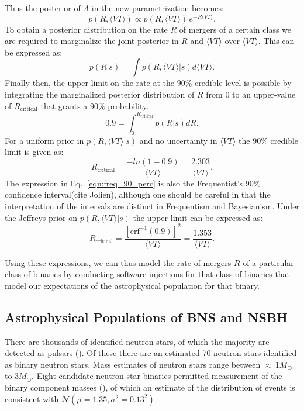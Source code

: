 Thus the posterior of $\Lambda$ in the new parametrization becomes:
\begin{equation}\label{eqn:posterior_lambda}
    p \left(R, \langle VT \rangle \right) \propto p\left(R, \langle VT \rangle \right) \, e^{-R \langle VT \rangle}.
\end{equation}
To obtain a posterior distribution on the rate $R$ of mergers of a certain class we are required to marginalize the joint-posterior in $R$ and $\langle VT \rangle$ over $\langle VT \rangle$. This can be expressed as:
\begin{equation}\label{eqn:posterior_rate}
    p\left(R | s\right) = \int p \left(R, \langle VT \rangle | s \right) d\langle VT \rangle.
\end{equation}
Finally then, the upper limit on the rate at the $90 \%$ credible level is possible by integrating the marginalized posterior distribution of $R$ from $0$ to an upper-value of $R_\mathrm{critical}$ that grants a $90 \%$ probability.
\begin{equation}\label{eqn:90perc_conf_int}
    0.9 = \int_0^{R_{\mathrm{critical}}} p\left(R | s\right) dR.
\end{equation}
For a uniform prior in $p \left(R, \langle VT \rangle | s \right)$ and no uncertainty in $\langle VT \rangle$ the $90 \%$ credible limit is given as:
\begin{equation}\label{eqn:freq_90_perc}
    R_{\mathrm{critical}} = \frac{- ln \left( 1 - 0.9 \right)}{\langle VT \rangle} = \frac{2.303}{\langle VT \rangle}.
\end{equation}
The expression in Eq.~\ref{eqn:freq_90_perc} is also the Frequentist's $90 \%$ confidence interval(cite Jolien), although one should be careful in that the interpretation of the intervals are distinct in Frequentism and Bayesianism. Under the Jeffreys prior on $p \left(R, \langle VT \rangle | s \right)$ the upper limit can be expressed as:
\begin{equation}\label{eqn:jeffreys_90_perc}
    R_{\mathrm{critical}} = \frac{\left[\mathrm{erf}^{-1}\left(0.9 \right) \right]^2}{\langle VT \rangle} = \frac{1.353}{\langle VT \rangle}.
\end{equation}

Using these expressions, we can thus model the rate of mergers $R$ of a particular class of binaries by conducting software injections for that class of binaries that model our expectations of the astrophysical population for that binary.

\subsection{Astrophysical Populations of BNS and NSBH}
There are thousands of identified neutron stars, of which the majority are detected as pulsars (). Of these there are an estimated 70 neutron stars identified as binary neutron stars. Mass estimates of neutron stars range between $\approx \, 1 M_\odot$ to $3 M_\odot$. Eight candidate neutron star binaries permitted measurement of the binary component masses (), of which an estimate of the distribution of events is consistent with $\mathcal{N} \left(\mu = 1.35, \sigma^2 = 0.13^2 \right)$.

